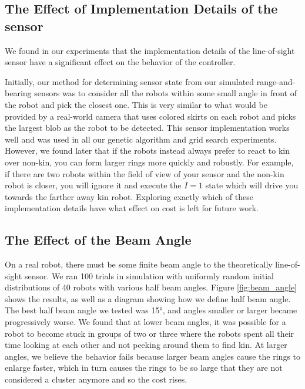 \documentclass[conference]{IEEEtran}
\begin{document}
  \subsection{The Effect of Implementation Details of the sensor} \label{section:sensor_impl}

    We found in our experiments that the implementation details of the line-of-sight sensor have a significant effect on the behavior of the controller.

    Initially, our method for determining sensor state from our simulated range-and-bearing sensors was to consider all the robots within some small angle in front of the robot and pick the closest one. This is very similar to what would be provided by a real-world camera that uses colored skirts on each robot and picks the largest blob as the robot to be detected. This sensor implementation works well and was used in all our genetic algorithm and grid search experiments. However, we found later that if the robots instead always prefer to react to kin over non-kin, you can form larger rings more quickly and robustly. For example, if there are two robots within the field of view of your sensor and the non-kin robot is closer, you will ignore it and execute the $I=1$ state which will drive you towards the farther away kin robot. Exploring exactly which of these implementation details have what effect on cost is left for future work.

  \subsection{The Effect of the Beam Angle} \label{section:beam_angle}

    On a real robot, there must be some finite beam angle to the theoretically line-of-sight sensor. We ran 100 trials in simulation with uniformly random initial distributions of 40 robots with various half beam angles. Figure \ref{fig:beam_angle} shows the results, as well as a diagram showing how we define half beam angle. The best half beam angle we tested was \ang{15}, and angles smaller or larger became progressively worse. We found that at lower beam angles, it was possible for a robot to become stuck in groups of two or three where the robots spent all their time looking at each other and not peeking around them to find kin. At larger angles, we believe the behavior fails because larger beam angles cause the rings to enlarge faster, which in turn causes the rings to be so large that they are not considered a cluster anymore and so the cost rises.
\end{document}
